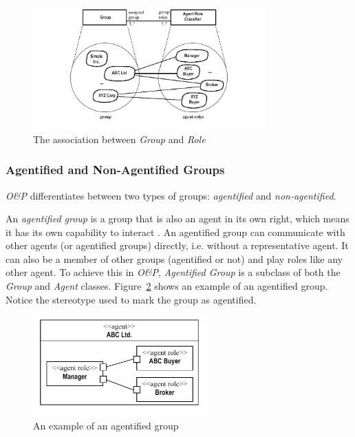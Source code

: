 \begin{figure}[ht]
	\centering
	\includegraphics[width=0.8\textwidth]{images/onp/group-role-association.png}
	\caption{The association between \textit{Group} and \textit{Role} \cite{Odell05}}
	\label{figure:onp-group-role-association}
\end{figure}

\subsubsection*{Agentified and Non-Agentified Groups}

\textit{O\&P} differentiates between two types of groups: \textit{agentified} and \textit{non-agentified}.

An \textit{agentified group} is a group that is also an agent in its own right, which means it has its own capability to interact \cite{Odell05}.
An agentified group can communicate with other agents (or agentified groups) directly, i.e. without a representative agent.
It can also be a member of other groups (agentified or not) and play roles like any other agent.
To achieve this in \textit{O\&P}, \textit{Agentified Group} is a subclass of both the \textit{Group} and \textit{Agent} classes.
Figure~\ref{figure:onp-agentified-group} shows an example of an agentified group.
Notice the  stereotype used to mark the group as agentified.

\begin{figure}[ht]
	\centering
	\includegraphics[width=0.6\textwidth]{images/onp/agentified-group.png}
	\caption{An example of an agentified group \cite{Odell05}}
	\label{figure:onp-agentified-group}
\end{figure}

